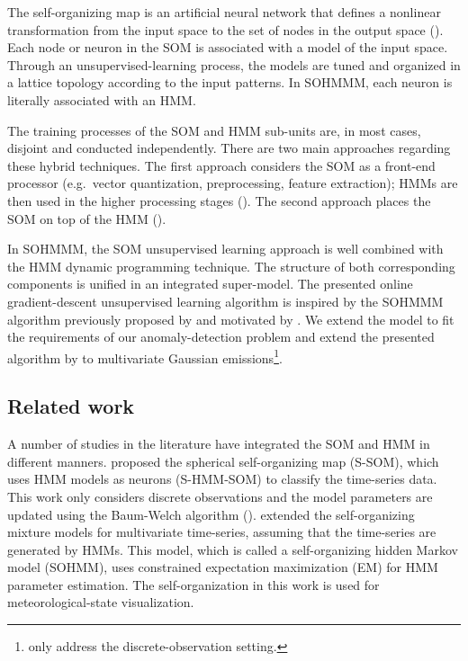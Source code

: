 The self-organizing map is an artificial neural network that defines a nonlinear transformation from the input space to the set of nodes in the output space (\citet{Somervuo2000}). Each node or neuron in the SOM is associated with a model of the input space. Through an unsupervised-learning process, the models are tuned and organized in a lattice topology according to the input patterns. In SOHMMM, each neuron is literally associated with an HMM.

The training processes of the SOM and HMM sub-units are, in most cases, disjoint and conducted independently. There are two main approaches regarding these hybrid techniques. The first approach considers the SOM as a front-end processor (e.g.\ vector quantization, preprocessing, feature extraction); HMMs are then used in the higher processing stages (\citet{Somervuo2000,Kurimo1996,Morimoto2016}). The second approach places the SOM on top of the HMM (\citet{Ferles2013,Ferles2013b,Lebbah2015}).

In SOHMMM, the SOM unsupervised learning approach is well combined with the HMM dynamic programming technique. The structure of both corresponding components is unified in an integrated super-model. The presented online gradient-descent unsupervised learning algorithm is inspired by the SOHMMM algorithm previously proposed by \citet{Ferles2013} and motivated by \citet{Baldi1994}. We extend the model to fit the requirements of our anomaly-detection problem and extend the presented algorithm by \citet{Ferles2013} to multivariate Gaussian emissions\footnote{\citet{Ferles2013} only address the discrete-observation setting.}.

\subsection{Related work}
A number of studies in the literature have integrated the SOM and HMM in different manners. \citet{Gen2012} proposed the spherical self-organizing map (S-SOM), which uses HMM models as neurons (S-HMM-SOM) to classify the time-series data. This work only considers discrete observations and the model parameters are updated using the Baum-Welch algorithm (\citet{Baum1972}). \citet{Yamaguchi2010} extended the self-organizing mixture models for multivariate time-series, assuming that the time-series are generated by HMMs. This model, which is called a self-organizing hidden Markov model (SOHMM), uses constrained expectation maximization (EM) for HMM parameter estimation. The self-organization in this work is used for meteorological-state visualization.

